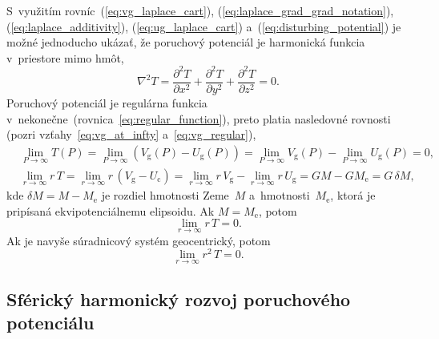 \documentclass[a4paper, 12pt]{book}
\newcommand{\gidx}{\mathrm g}
\newcommand{\cidx}{\mathrm c}
\begin{document}
S~využitím rovníc~(\ref{eq:vg_laplace_cart}), 
(\ref{eq:laplace_grad_grad_notation}), (\ref{eq:laplace_additivity}), 
(\ref{eq:ug_laplace_cart}) a~(\ref{eq:disturbing_potential}) je možné 
jednoducho ukázať, že poruchový potenciál je harmonická funkcia v~priestore 
mimo hmôt,
%
\begin{equation}
\label{eq:laplace_xyz_t}
\nabla^2 T = \frac{\partial^2 T}{\partial x^2} + \frac{\partial^2 T}{\partial 
y^2} + \frac{\partial^2 T}{\partial z^2} = 0{.}
\end{equation}
%
Poruchový potenciál je regulárna funkcia 
v~nekonečne~(rovnica~\ref{eq:regular_function}), preto platia nasledovné 
rovnosti (pozri vzťahy~\ref{eq:vg_at_infty} a~\ref{eq:vg_regular}),
%
\begin{align}
\label{eq:t_infty}
&\lim_{P \rightarrow \infty} T(P) = \lim_{P \rightarrow \infty} (V_\gidx(P) 
- U_\gidx(P)) = \lim_{P \rightarrow \infty} V_\gidx(P) - \lim_{P \rightarrow 
\infty} U_\gidx(P) = 0{,}\\
%
\label{eq:t_regular}
&\lim_{r \rightarrow \infty} r \, T = \lim_{r \rightarrow \infty} r \, (V_\gidx 
 - U_\cidx) = \lim_{r \rightarrow \infty} r \, V_\gidx - \lim_{r \rightarrow 
 \infty} r \, U_\gidx = GM - GM_{\mathrm{e}} = G \, \delta M{,}
\end{align}
%
kde $\delta M = M - M_\mathrm{e}$ je rozdiel hmotnosti Zeme~$M$ 
a~hmotnosti~$M_\mathrm{e}$, ktorá je pripísaná ekvipotenciálnemu elipsoidu.  Ak 
$M = M_\mathrm{e}$, potom
%
\begin{equation}
\lim_{r \rightarrow \infty} r \, T = 0{.}
\end{equation}
%
Ak je navyše súradnicový systém geocentrický, potom \parencite{Pick1973}
%
\begin{equation}
\lim_{r \rightarrow \infty} r^2 \, T = 0{.}
\end{equation}


\subsection{Sférický harmonický rozvoj poruchového potenciálu}
\end{document}
